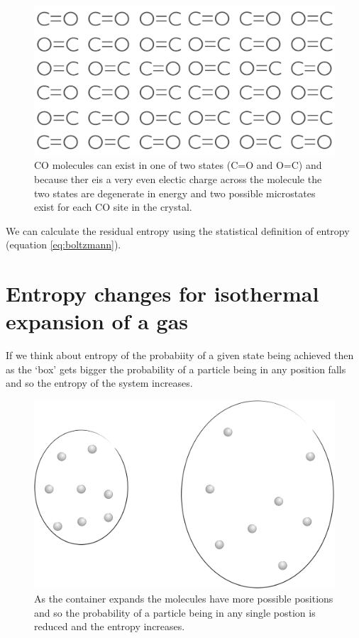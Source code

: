 \documentclass[
]{book}
\begin{document}
\begin{figure}

{\centering \includegraphics[width=0.8\linewidth]{images/CO} 

}

\caption{CO molecules can exist in one of two states (C=O and O=C) and because ther eis a very even electic charge across the molecule the two states are degenerate in energy and two possible microstates exist for each CO site in the crystal.}\label{fig:CO}
\end{figure}

We can calculate the residual entropy using the statistical definition of entropy (equation \eqref{eq:boltzmann}).

\hypertarget{entropy-changes-for-isothermal-expansion-of-a-gas}{%
\section{Entropy changes for isothermal expansion of a gas}\label{entropy-changes-for-isothermal-expansion-of-a-gas}}

If we think about entropy of the probabiity of a given state being achieved then as the `box' gets bigger the probability of a particle being in any position falls and so the entropy of the system increases.

\begin{figure}

{\centering \includegraphics[width=0.8\linewidth]{images/entropyexpansion} 

}

\caption{As the container expands the molecules have more possible positions and so the probability of a particle being in any single postion is reduced and the entropy increases.}\label{fig:entropyexpansion}
\end{figure}
\end{document}
